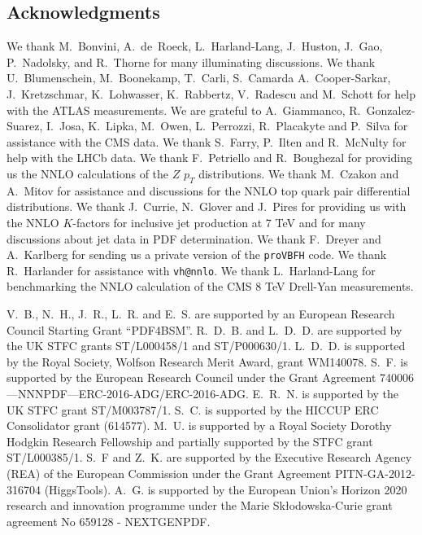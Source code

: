 \subsection*{Acknowledgments}

We thank M.~Bonvini, A.~de~Roeck, 
L.~Harland-Lang, J.~Huston, J.~Gao, P.~Nadolsky,  and
R.~Thorne for many illuminating discussions.
%
We thank U.~Blumenschein, M.~Boonekamp,
T.~Carli, S.~Camarda  A.~Cooper-Sarkar, J.~Kretzschmar, K.~Lohwasser,
K.~Rabbertz, V.~Radescu and M.~Schott
for help with the ATLAS measurements.
%
We are grateful to 
A.~Giammanco, R.~Gonzalez-Suarez, I.~Josa,  K.~Lipka, M.~Owen, L.~Perrozzi, R.~Placakyte and P.~Silva
for assistance with the CMS data.
%
We thank S.~Farry, P.~Ilten and R.~McNulty for help with the LHCb data.
%
We thank F.~Petriello and R.~Boughezal for providing us the
NNLO calculations of the $Z$ $p_T$ distributions.
%
We thank M.~Czakon and A.~Mitov for assistance and discussions for
the NNLO top quark pair differential distributions.
%
We thank J.~Currie, N.~Glover and J.~Pires for providing
us with the NNLO $K$-factors for inclusive jet production
at 7 TeV and for many discussions about jet data in PDF determination.
%
We thank F.~Dreyer and A.~Karlberg for sending us a private version
of the {\tt proVBFH} code.
%
We thank R.~Harlander for assistance with {\tt vh@nnlo}.
%
We thank L.~Harland-Lang for benchmarking the
NNLO calculation of the CMS 8 TeV Drell-Yan measurements.

V.~B., N.~H., J.~R., L.~R. and E.~S. are
supported by an European Research Council Starting Grant ``PDF4BSM''.
%
R.~D.~B. and L.~D.~D. are supported by the
UK STFC grants ST/L000458/1 and ST/P000630/1.
%
L.~D.~D. is supported by
the Royal Society, Wolfson Research Merit Award, grant WM140078.
%
S.~F. is supported by the European Research Council under the Grant Agreement
740006—NNNPDF—ERC-2016-ADG/ERC-2016-ADG.
E.~R.~N. is supported by the UK STFC grant ST/M003787/1.
%
S.~C. is supported by the HICCUP ERC Consolidator grant (614577).
%
M.~U. is
supported by a Royal Society Dorothy Hodgkin Research
Fellowship and partially supported
by the STFC grant ST/L000385/1.
%
S.~F and Z.~K. are supported by the Executive Research Agency (REA) of
the European Commission under the Grant Agreement PITN-GA-2012-316704
(HiggsTools).
%
A.~G. is supported by the European Union's Horizon 2020 research and innovation 
programme under the Marie Sk\l odowska-Curie grant agreement No 659128 - NEXTGENPDF.


